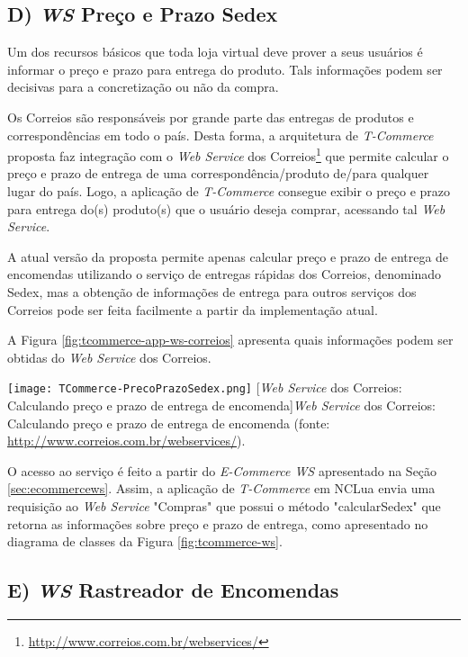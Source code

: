 \subsection*{D) \textit{WS} Preço e Prazo Sedex}

Um dos recursos básicos que toda loja virtual deve prover a seus usuários é 
informar o preço e prazo para entrega do produto. Tals informações
podem ser decisivas para a concretização ou não da compra.

Os Correios são responsáveis por grande parte das entregas de produtos e correspondências em todo o país.
Desta forma, a arquitetura de \textit{T-Commerce} proposta faz integração com 
o \textit{Web Service} dos Correios\footnote{\url{http://www.correios.com.br/webservices/}} que permite calcular o preço e prazo de entrega
de uma correspondência/produto de/para qualquer lugar do país.
Logo, a aplicação de \textit{T-Commerce} consegue exibir o preço e prazo para entrega do(s) produto(s)
que o usuário deseja comprar, acessando tal \textit{Web Service}.

A atual versão da proposta permite apenas calcular preço e prazo de entrega de encomendas
utilizando o serviço de entregas rápidas dos Correios, denominado Sedex, mas
a obtenção de informações de entrega para outros serviços dos Correios
pode ser feita facilmente a partir da implementação atual.

A Figura \ref{fig:tcommerce-app-ws-correios} apresenta quais informações
podem ser obtidas do \textit{Web Service} dos Correios. 

\begin{center}
	\texttt{[image: TCommerce-PrecoPrazoSedex.png]}
	[\textit{Web Service} dos Correios: Calculando preço e prazo de entrega de encomenda]{\textit{Web Service} dos Correios: Calculando preço e prazo de entrega de encomenda (fonte: \url{http://www.correios.com.br/webservices/}).}
	\label{fig:tcommerce-app-ws-correios}
\end{center}


O acesso ao serviço é feito a partir do \textit{E-Commerce WS} apresentado na Seção \ref{sec:ecommercews}.
Assim, a aplicação de \textit{T-Commerce} em NCLua envia uma requisição ao \textit{Web Service} "Compras"
que possui o método "calcularSedex" que retorna as informações sobre preço e prazo de entrega,
como apresentado no diagrama de classes da Figura \ref{fig:tcommerce-ws}.


\subsection*{E) \textit{WS} Rastreador de Encomendas}

